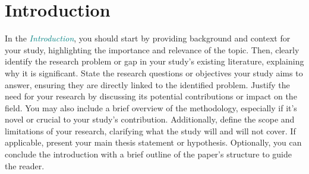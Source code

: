 \section{Introduction}
\label{sec:introduction}


In the \textcolor{teal}{\textit{Introduction}}, you should start by providing background and context for your study, highlighting the importance and relevance of the topic. 
Then, clearly identify the research problem or gap in your study's existing literature, explaining why it is significant. 
State the research questions or objectives your study aims to answer, ensuring they are directly linked to the identified problem. 
Justify the need for your research by discussing its potential contributions or impact on the field.
You may also include a brief overview of the methodology, especially if it's novel or crucial to your study's contribution. 
Additionally, define the scope and limitations of your research, clarifying what the study will and will not cover.
If applicable, present your main thesis statement or hypothesis. 
Optionally, you can conclude the introduction with a brief outline of the paper's structure to guide the reader.